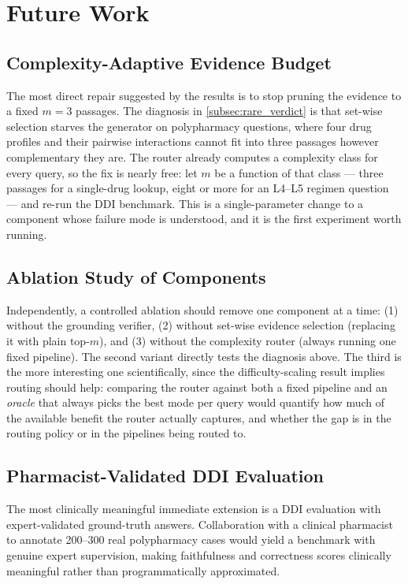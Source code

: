 \section{Future Work}
\label{sec:future_work}

\subsection{Complexity-Adaptive Evidence Budget}
\label{subsec:future_budget}
The most direct repair suggested by the results is to stop pruning the evidence to
a fixed $m = 3$ passages.
The diagnosis in \cref{subsec:rare_verdict} is that set-wise selection starves the
generator on polypharmacy questions, where four drug profiles and their pairwise
interactions cannot fit into three passages however complementary they are.
The router already computes a complexity class for every query, so the fix is
nearly free: let $m$ be a function of that class --- three passages for a
single-drug lookup, eight or more for an L4--L5 regimen question --- and re-run the
DDI benchmark.
This is a single-parameter change to a component whose failure mode is understood,
and it is the first experiment worth running.

\subsection{Ablation Study of \rarerag{} Components}
\label{subsec:future_ablation}
Independently, a controlled ablation should remove one \rarerag{} component at a
time: (1) without the grounding verifier, (2) without set-wise evidence selection
(replacing it with plain top-$m$), and (3) without the complexity router (always
running one fixed pipeline).
The second variant directly tests the diagnosis above.
The third is the more interesting one scientifically, since the difficulty-scaling
result implies routing should help: comparing the router against both a fixed
pipeline and an \emph{oracle} that always picks the best mode per query would
quantify how much of the available benefit the router actually captures, and
whether the gap is in the routing policy or in the pipelines being routed to.

\subsection{Pharmacist-Validated DDI Evaluation}
The most clinically meaningful immediate extension is a DDI evaluation with
expert-validated ground-truth answers.
Collaboration with a clinical pharmacist to annotate 200--300 real polypharmacy
cases would yield a benchmark with genuine expert supervision, making faithfulness
and correctness scores clinically meaningful rather than programmatically
approximated.


